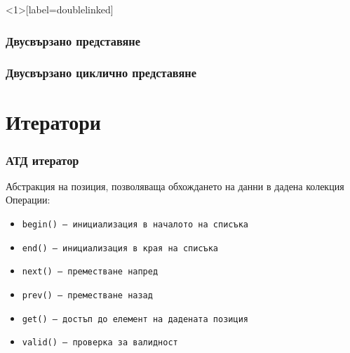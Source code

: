 \documentclass[alsotrans]{beamerswitch}
\newcommand{\doublelinkedchain}{
  \triplecell{a1}{a_1}
  \nexttriplecell{a2}{a_2}{a1}
  \triplenextdots{a2}
  \dotsnexttriplecell{an}{a_n}
}
\begin{document}
\begin{frame}<1>[label=doublelinked]
  \frametitle{Двусвързано представяне}

  \begin{center}
  \end{center}
\end{frame}

\begin{frame}
  \frametitle{Двусвързано циклично представяне}

  \begin{center}
  \end{center}
\end{frame}

\section{Итератори}

\begin{frame}
  \frametitle{АТД итератор}

  Абстракция на позиция, позволяваща обхождането на данни в дадена колекция\\[2ex]
  Операции:\\[1ex]
  \begin{itemize}
  \item \tt{begin()} -- инициализация в началото на списъка
  \item \tt{end()} -- инициализация в края на списъка
  \item \tt{next()} -- преместване напред
  \item \tt{prev()} -- преместване назад
  \item \tt{get()} -- достъп до елемент на дадената позиция
  \item \tt{valid()} -- проверка за валидност
  \end{itemize}
\end{frame}
\end{document}
